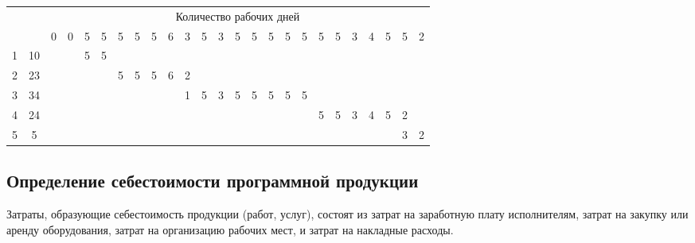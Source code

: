 \begin{table}[ht!]
\begin{tabular}{|c|c|c|c|c|c|c|c|c|c|c|c|c|c|c|c|c|c|c|c|c|c|c|c|c|}
                & & \multicolumn{23}{|c|}{Количество рабочих дней} \\ \cline{3-25}

                  &    & 0 & 0 & 5 & 5 & 5 & 5 & 5 & 6 & 3 & 5 & 3 & 5 & 5 & 5 & 5 & 5 & 5 & 5 & 3 & 4 & 5 & 5 & 2 \\ \hline
                1 & 10 &   &   & 5 & 5 &   &   &   &   &   &   &   &   &   &   &   &   &   &   &   &   &   &   &   \\ \hline
                2 & 23 &   &   &   &   & 5 & 5 & 5 & 6 & 2 &   &   &   &   &   &   &   &   &   &   &   &   &   &   \\ \hline
                3 & 34 &   &   &   &   &   &   &   &   & 1 & 5 & 3 & 5 & 5 & 5 & 5 & 5 &   &   &   &   &   &   &   \\ \hline
                4 & 24 &   &   &   &   &   &   &   &   &   &   &   &   &   &   &   &   & 5 & 5 & 3 & 4 & 5 & 2 &   \\ \hline
                5 & 5  &   &   &   &   &   &   &   &   &   &   &   &   &   &   &   &   &   &   &   &   &   & 3 & 2 \\ \hline
            \end{tabular}
        \end{table}

    \subsection{Определение себестоимости программной продукции}
        Затраты, образующие себестоимость продукции (работ, услуг), состоят из затрат на заработную плату исполнителям, затрат на закупку или аренду оборудования, затрат на организацию рабочих мест, и затрат на накладные расходы.

